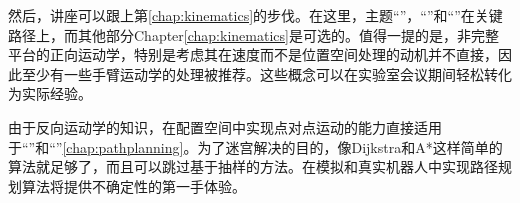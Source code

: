 然后，讲座可以跟上第\ref{chap:kinematics}的步伐。在这里，主题“”，“”和“”在关键路径上，而其他部分Chapter\ref{chap:kinematics}是可选的。值得一提的是，非完整平台的正向运动学，特别是考虑其在速度而不是位置空间处理的动机并不直接，因此至少有一些手臂运动学的处理被推荐。这些概念可以在实验室会议期间轻松转化为实际经验。

由于反向运动学的知识，在配置空间中实现点对点运动的能力直接适用于“”和“”\ref{chap:pathplanning}。为了迷宫解决的目的，像Dijkstra和A*这样简单的算法就足够了，而且可以跳过基于抽样的方法。在模拟和真实机器人中实现路径规划算法将提供不确定性的第一手体验。




